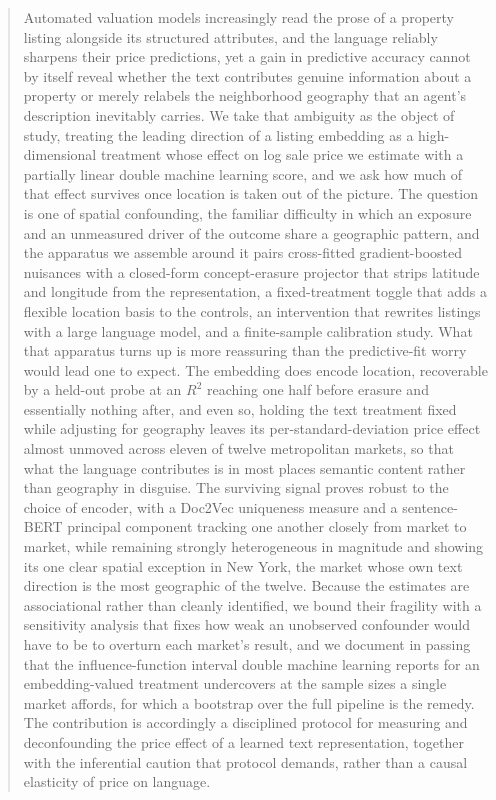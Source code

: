 \begin{abstract}

Automated valuation models increasingly read the prose of a property listing
alongside its structured attributes, and the language reliably sharpens their
price predictions, yet a gain in predictive accuracy cannot by itself reveal
whether the text contributes genuine information about a property or merely
relabels the neighborhood geography that an agent's description inevitably
carries. We take that ambiguity as the object of study, treating the leading
direction of a listing embedding as a high-dimensional treatment whose effect on
log sale price we estimate with a partially linear double machine learning score,
and we ask how much of that effect survives once location is taken out of the
picture. The question is one of spatial confounding, the familiar difficulty in
which an exposure and an unmeasured driver of the outcome share a geographic
pattern, and the apparatus we assemble around it pairs cross-fitted
gradient-boosted nuisances with a closed-form concept-erasure projector that
strips latitude and longitude from the representation, a fixed-treatment toggle
that adds a flexible location basis to the controls, an intervention that rewrites
listings with a large language model, and a finite-sample calibration study.
What that apparatus turns up is more reassuring than the predictive-fit worry
would lead one to expect. The embedding does encode location, recoverable by a
held-out probe at an $R^2$ reaching one half before erasure and essentially
nothing after, and even so, holding the text treatment fixed while adjusting for
geography leaves its per-standard-deviation price effect almost unmoved across
eleven of twelve metropolitan markets, so that what the language contributes is in
most places semantic content rather than geography in disguise. The surviving
signal proves robust to the choice of encoder, with a Doc2Vec uniqueness measure
and a sentence-BERT principal component tracking one another closely from market
to market, while remaining strongly heterogeneous in magnitude and showing its
one clear spatial exception in New York, the market whose own text direction is
the most geographic of the twelve. Because the estimates are associational rather
than cleanly identified, we bound their fragility with a sensitivity analysis that
fixes how weak an unobserved confounder would have to be to overturn each market's
result, and we document in passing that the influence-function interval double
machine learning reports for an embedding-valued treatment undercovers at the
sample sizes a single market affords, for which a bootstrap over the full pipeline
is the remedy. The contribution is accordingly a disciplined protocol for
measuring and deconfounding the price effect of a learned text representation,
together with the inferential caution that protocol demands, rather than a causal
elasticity of price on language.

\end{abstract}
